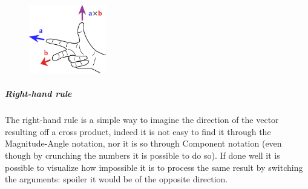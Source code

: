 \begin{figure}
    \includegraphics[width=0.3\textwidth]{chapters/vectors/images/right_hand_rule.pdf}
\end{figure}
\subparagraph{Right-hand rule} The right-hand rule is a simple way to imagine the direction of the vector resulting off a cross product, indeed it is not easy to find it through the Magnitude-Angle notation, nor it is so through Component notation (even though by crunching the numbers it is possible to do so). If done well it is possible to visualize how impossible it is to process the same result by switching the arguments: spoiler it would be of the opposite direction.